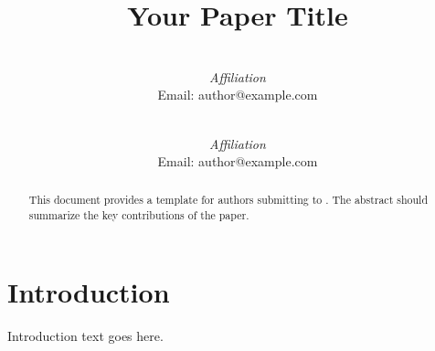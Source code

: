\documentclass{article}
\title{Your Paper Title}
\author{
    \customauthor{Author Name} \\
    \textit{Affiliation} \\
    Email: author@example.com
    \and
    \customauthor{Author Name} \\
    \textit{Affiliation} \\
    Email: author@example.com}
\date{}
\begin{document}
\maketitle

\begin{abstract}
This document provides a template for authors submitting to \confname. The abstract should summarize the key contributions of the paper.
\end{abstract}


\section{Introduction}
Introduction text goes here.




\end{document}
